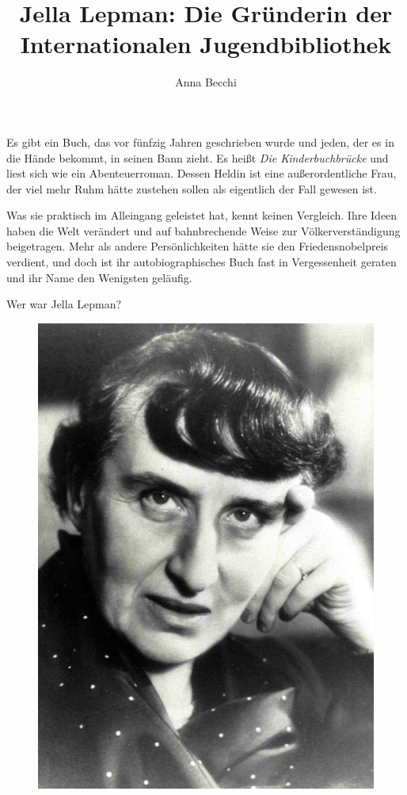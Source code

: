 \documentclass[a4paper,
fontsize=11pt,
oneside,
numbers=noperiodatend,
parskip=half-,
bibliography=totoc,
final
]{scrartcl}
\title{\LARGE{Jella Lepman: Die Gründerin der Internationalen Jugendbibliothek}} %
\author{Anna Becchi} %
\date{}
\begin{document}
\maketitle
\thispagestyle{fancyplain} 


Es gibt ein Buch, das vor fünfzig Jahren geschrieben wurde und jeden,
der es in die Hände bekommt, in seinen Bann zieht. Es heißt \emph{Die
Kinderbuchbrücke} und liest sich wie ein Abenteuerroman. Dessen Heldin
ist eine außerordentliche Frau, der viel mehr Ruhm hätte zustehen sollen
als eigentlich der Fall gewesen ist.~

Was sie praktisch im Alleingang geleistet hat, kennt keinen Vergleich.
Ihre Ideen haben die Welt verändert und auf bahnbrechende Weise zur
Völkerverständigung beigetragen. Mehr als andere Persönlichkeiten hätte
sie den Friedensnobelpreis verdient, und doch ist ihr autobiographisches
Buch fast in Vergessenheit geraten und ihr Name den Wenigsten geläufig.

Wer war Jella Lepman?

\begin{figure}[htbp]
\centering
\includegraphics{img/bild1.jpg}
\end{figure}
\end{document}
